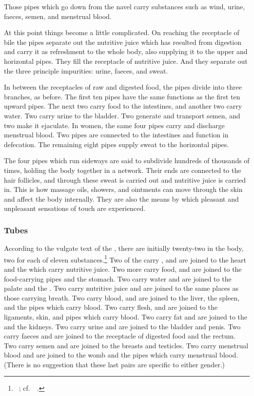 \begin{refsection}
Those pipes which go down from the navel carry substances such as
wind, urine, faeces, semen, and menstrual blood.

At this point things become a little complicated.  On reaching the
receptacle of bile the pipes separate out the nutritive juice which
has resulted from digestion and carry it as refreshment to the whole
body, also supplying it to the upper and horizontal pipes. They fill
the receptacle of nutritive juice. And they separate out the three
principle impurities: urine, faeces, and sweat.

In between the receptacles of raw and digested food, the pipes
divide into three branches, as before.  The first ten pipes
have the same functions as the first ten upward pipes. The
next two carry food to the intestines, and another two carry
water.  Two carry urine to the bladder.  Two generate and
transport semen, and two make it ejaculate.  In women, the
same four pipes carry and discharge menstrual blood.  Two
pipes are connected to the intestines and function in
defecation. The remaining eight pipes supply sweat to the
horizontal pipes.

The four pipes which run sideways are said to subdivide hundreds of
thousands of times, holding the body together in a network. Their ends
are connected to the hair follicles, and through these sweat is
carried out and nutritive juice is carried in.  This is how massage
oils, showers, and ointments can move through the skin and affect the
body internally.  They are also the means by which pleasant and
unpleasant sensations of touch are experienced.

\subsubsection{Tubes}

According to the vulgate text of the \SS, there are initially
twenty-two  in the body, two for each of eleven
substances.\footnote{\SS\ ; cf.\ \CS\
    .} Two of the  carry
    , and are joined to the heart and the
     which carry nutritive juice. Two more carry food,
    and are joined to the food-carrying pipes and the stomach. Two carry
    water and are joined to the palate and the \se{kloman}{lung}. Two
    carry nutritive juice and are joined to the same places as those
    carrying breath.  Two carry blood, and are joined to the liver, the
    spleen, and the pipes which carry blood. Two carry flesh, and are
    joined to the ligaments, skin, and pipes which carry blood. Two carry
    fat and are joined to the \se{kaṭī}{waist} and the kidneys.  Two carry
    urine and are joined to the bladder and penis. Two carry faeces and
    are joined to the receptacle of digested food and the rectum. Two
    carry semen and are joined to the breasts and testicles. Two carry
    menstrual blood and are joined to the womb and the pipes which carry
    menstrual blood. (There is no suggestion that these last pairs are
    specific to either gender.)


\end{refsection}
